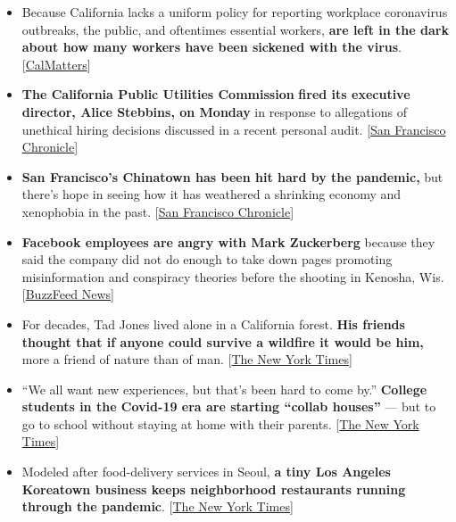 \begin{itemize}
\item
  Because California lacks a uniform policy for reporting workplace
  coronavirus outbreaks, the public, and oftentimes essential workers,
  \textbf{are left in the dark about how many workers have been sickened
  with the virus}.
  {[}\href{https://calmatters.org/california-divide/2020/08/california-counties-wont-report-covid-essential-workplace-outbreaks/}{CalMatters}{]}
\item
  \textbf{The California Public Utilities Commission} \textbf{fired its
  executive director, Alice Stebbins, on Monday} in response to
  allegations of unethical hiring decisions discussed in a recent
  personal audit.
  {[}\href{https://www.sfchronicle.com/business/article/California-Public-Utilities-Commission-fires-15528599.php}{San
  Francisco Chronicle}{]}
\item
  \textbf{San Francisco's Chinatown has been hit hard by the pandemic,}
  but there's hope in seeing how it has weathered a shrinking economy
  and xenophobia in the past.
  {[}\href{https://www.sfchronicle.com/culture/article/SF-Chinatown-has-always-adapted-To-survive-the-15520348.php}{San
  Francisco Chronicle}{]}
\item
  \textbf{Facebook employees are angry with Mark Zuckerberg} because
  they said the company did not do enough to take down pages promoting
  misinformation and conspiracy theories before the shooting in Kenosha,
  Wis.
  {[}\href{https://www.buzzfeednews.com/article/ryanmac/facebook-employees-slam-zuckerberg-kenosha-militia-shooting}{BuzzFeed
  News}{]}
\item
  For decades, Tad Jones lived alone in a California forest. \textbf{His
  friends thought that if anyone could survive a wildfire it would be
  him,} more a friend of nature than of man.
  {[}\href{https://www.nytimes3xbfgragh.onion/2020/08/31/us/fires-california-monk-tad-jones-last-chance-santa-cruz.html}{The
  New York Times}{]}
\item
  ``We all want new experiences, but that's been hard to come by.''
  \textbf{College students in the Covid-19 era are starting ``collab
  houses''} --- but to go to school without staying at home with their
  parents.
  {[}\href{https://www.nytimes3xbfgragh.onion/2020/08/28/style/college-collab-houses-coronavirus.html}{The
  New York Times}{]}
\item
  Modeled after food-delivery services in Seoul, \textbf{a tiny Los
  Angeles Koreatown business keeps neighborhood restaurants running
  through the pandemic}.
  {[}\href{https://www.nytimes3xbfgragh.onion/2020/08/31/dining/los-angeles-food-delivery-runningman.html}{The
  New York Times}{]}
\end{itemize}

